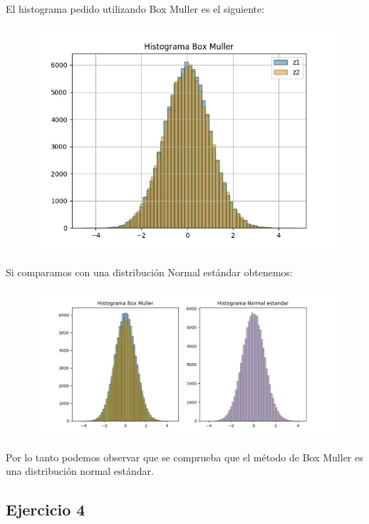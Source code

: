 \documentclass[11pt,a4paper]{article}
\begin{document}
		El histograma pedido utilizando Box Muller es el siguiente:
		\begin{figure}[H]
  			\centering
    			\includegraphics[width=14cm]{imagenes/histogramaEjer3}
		\end{figure}

		Si comparamos con una distribución Normal estándar obtenemos:
		\begin{figure}[H]
  			\centering
    			\includegraphics[width=20cm]{imagenes/histogramasEjer3}
		\end{figure}
		
		Por lo tanto podemos observar que se comprueba que el método de Box Muller es una distribución normal estándar.


	\subsection{Ejercicio 4}
\end{document}
